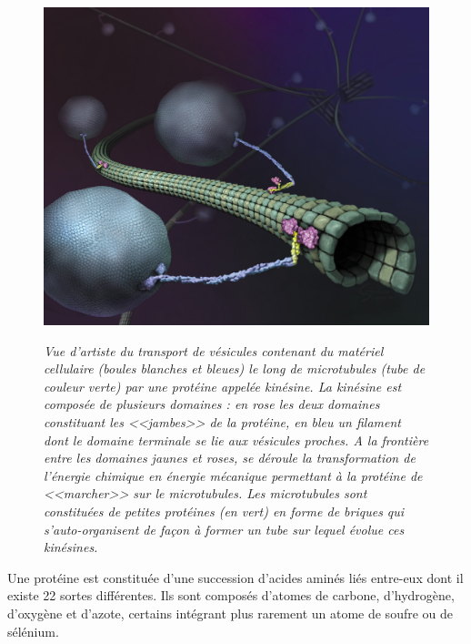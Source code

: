 \begin{figure}[h]
  \centering
  {\includegraphics[width=0.85\linewidth]{./figures/ch1/kinesincargoart}}
    \caption{\it Vue d’artiste du transport de vésicules contenant du matériel cellulaire (boules blanches et bleues) le long de microtubules (tube de couleur verte) par une protéine appelée kinésine. La kinésine est composée de plusieurs domaines : en rose les deux domaines constituant les <<jambes>> de la protéine, en bleu un filament dont le domaine terminale se lie aux vésicules proches. A la frontière entre les domaines jaunes et roses, se déroule la transformation de l'énergie chimique en énergie mécanique permettant à la protéine de <<marcher>> sur le microtubules. Les microtubules sont constituées de petites protéines (en vert) en forme de briques qui s'auto-organisent de façon à former un tube sur lequel évolue ces kinésines.}
    \label{Fig:kinesincargoart}
  \hspace{0.2cm}
\end{figure}


Une protéine est constituée d'une succession d'acides aminés liés entre-eux dont il existe 22 sortes différentes. Ils sont composés d'atomes de carbone, d'hydrogène, d'oxygène et d'azote, certains intégrant plus rarement un atome de soufre ou de sélénium.


